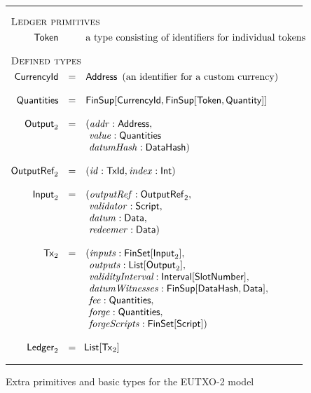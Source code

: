 \documentclass[a4paper]{article}
\renewcommand{\i}{\textit}  %
\newcommand{\s}{\textsf}  %
\newcommand{\msf}[1]{\ensuremath{\mathsf{#1}}}
\newcommand{\mi}[1]{\ensuremath{\mathit{#1}}}
\newcommand\rfskip{7pt}
\newenvironment{ruledfigure}[1]{\begin{figure}[#1]\hrule\vspace{\rfskip}}{\vspace{\rfskip}\hrule\end{figure}}
\newcommand{\List}[1]{\ensuremath{\s{List}[#1]}}
\newcommand{\FinSet}[1]{\ensuremath{\s{FinSet}[#1]}}
\newcommand{\Interval}[1]{\ensuremath{\s{Interval}[#1]}}
\newcommand{\FinSup}[2]{\ensuremath{\s{FinSup}[#1,#2]}}
\newcommand{\script}{\ensuremath{\s{Script}}}
\newcommand{\TxId}{\ensuremath{\s{TxId}}}
\newcommand{\txrefid}{\mi{id}}
\newcommand{\Address}{\ensuremath{\s{Address}}}
\newcommand{\DataHash}{\ensuremath{\s{DataHash}}}
\newcommand{\idx}{\mi{index}}
\newcommand{\inputs}{\mi{inputs}}
\newcommand{\outputs}{\mi{outputs}}
\newcommand{\forge}{\mi{forge}}
\newcommand{\forgeScripts}{\mi{forgeScripts}}
\newcommand{\fee}{\mi{fee}}
\newcommand{\addr}{\mi{addr}}
\newcommand{\val}{\mi{value}}  %
\newcommand{\validator}{\mi{validator}}
\newcommand{\redeemer}{\mi{redeemer}}
\newcommand{\datum}{\mi{datum}}
\newcommand{\datumHash}{\mi{datumHash}}
\newcommand{\datumWits}{\mi{datumWitnesses}}
\newcommand{\Data}{\ensuremath{\s{Data}}}
\newcommand{\outputref}{\mi{outputRef}}
\newcommand{\slotnum}{\ensuremath{\s{SlotNumber}}}
\newcommand{\eutxotx}{\msf{Tx}}
\newcommand{\qty}{\ensuremath{\s{Quantity}}}
\newcommand{\token}{\ensuremath{\s{Token}}}
\newcommand{\currency}{\ensuremath{\s{CurrencyId}}}
\newcommand{\qtymap}{\ensuremath{\s{Quantities}}}
\begin{document}
\begin{ruledfigure}{H}
  \begin{displaymath}
    \begin{array}{rll}
      \multicolumn{3}{l}{\textsc{Ledger primitives}}\\[4pt]
    \token     && \mbox{a type consisting of identifiers for individual tokens}\\
    \\
    
    \multicolumn{3}{l}{\textsc{Defined types}}\\[4pt]
    \currency  &=& \Address \enspace\mbox{(an identifier for a custom currency)}\\
    \\
    \qtymap   &=& \FinSup{\currency}{\FinSup{\token}{\qty}}\\
    \\
    \s{Output}_2 &=&(\addr: \Address,\\
                 & &\ \val: \qtymap\\
                 & &\ \datumHash: \DataHash)\\
    \\
    \s{OutputRef}_2 &= &(\txrefid: \TxId, \idx: \s{Int})\\
    \\
    \s{Input}_2 &=&( \outputref: \sf{OutputRef}_2,\\
                & &\ \validator: \script,\\
                & &\ \datum: \Data,\\
                & &\ \redeemer: \Data)\\
    \\
    \eutxotx_2 &=&(\inputs: \FinSet{\s{Input}_2},\\
               & &\ \outputs: \List{\s{Output}_2},\\
               & &\ \i{validityInterval}: \Interval{\slotnum},\\
               & &\ \datumWits: \FinSup{\DataHash}{\Data},\\
               & &\ \fee: \qtymap,\\
               & &\ \forge: \qtymap,\\
               & &\ \forgeScripts: \FinSet{\script})\\
    \\
    \s{Ledger}_2 &=&\!\List{\eutxotx_2}\\
    \end{array}
  \end{displaymath}
  \caption{Extra primitives and basic types for the EUTXO-2 model}
  \label{fig:eutxo-2-types}
\end{ruledfigure}
\end{document}
